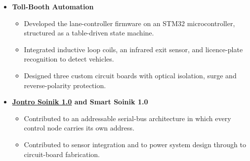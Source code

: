 \documentclass[10pt]{article}
\begin{document}
\begin{itemize}[label={}, leftmargin=0pt, itemsep=5pt]
    \item \textbf{Toll-Booth Automation}
    \begin{itemize}
        \item Developed the lane-controller firmware on an STM32 microcontroller, structured as a
        table-driven state machine.
        \item Integrated inductive loop coils, an infrared exit sensor, and licence-plate
        recognition to detect vehicles.
        \item Designed three custom circuit boards with optical isolation, surge and reverse-polarity protection.
    \end{itemize}

    \item \textbf{\href{https://www.youtube.com/watch?v=3r5VhLD1Ths}{Jontro Soinik 1.0} and Smart
    Soinik 1.0}
    \begin{itemize}
        \item Contributed to an addressable serial-bus architecture in which every control node carries
        its own address.
        \item Contributed to sensor integration
        and to power system design through to circuit-board fabrication.
    \end{itemize}


\end{itemize}
\end{document}
